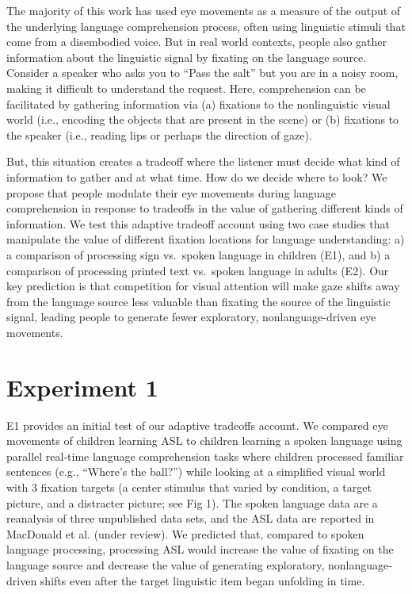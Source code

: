 \documentclass[10pt, letterpaper]{article}
\begin{document}
The majority of this work has used eye movements as a measure of the
output of the underlying language comprehension process, often using
linguistic stimuli that come from a disembodied voice. But in real world
contexts, people also gather information about the linguistic signal by
fixating on the language source. Consider a speaker who asks you to
``Pass the salt'' but you are in a noisy room, making it difficult to
understand the request. Here, comprehension can be facilitated by
gathering information via (a) fixations to the nonlinguistic visual
world (i.e., encoding the objects that are present in the scene) or (b)
fixations to the speaker (i.e., reading lips or perhaps the direction of
gaze).

But, this situation creates a tradeoff where the listener must decide
what kind of information to gather and at what time. How do we decide
where to look? We propose that people modulate their eye movements
during language comprehension in response to tradeoffs in the value of
gathering different kinds of information. We test this adaptive tradeoff
account using two case studies that manipulate the value of different
fixation locations for language understanding: a) a comparison of
processing sign vs.~spoken language in children (E1), and b) a
comparison of processing printed text vs.~spoken language in adults
(E2). Our key prediction is that competition for visual attention will
make gaze shifts away from the language source less valuable than
fixating the source of the linguistic signal, leading people to generate
fewer exploratory, nonlanguage-driven eye movements.

\section{Experiment 1}\label{experiment-1}

E1 provides an initial test of our adaptive tradeoffs account. We
compared eye movements of children learning ASL to children learning a
spoken language using parallel real-time language comprehension tasks
where children processed familiar sentences (e.g., ``Where's the
ball?'') while looking at a simplified visual world with 3 fixation
targets (a center stimulus that varied by condition, a target picture,
and a distracter picture; see Fig 1). The spoken language data are a
reanalysis of three unpublished data sets, and the ASL data are reported
in MacDonald et al. (under review). We predicted that, compared to
spoken language processing, processing ASL would increase the value of
fixating on the language source and decrease the value of generating
exploratory, nonlanguage-driven shifts even after the target linguistic
item began unfolding in time.
\end{document}
